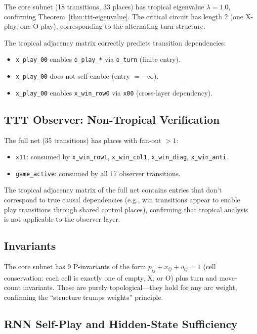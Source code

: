 \documentclass[11pt,a4paper]{article}
\begin{document}
The core subnet (18 transitions, 33 places) has tropical eigenvalue $\lambda = 1.0$, confirming Theorem~\ref{thm:ttt-eigenvalue}.
The critical circuit has length 2 (one X-play, one O-play), corresponding to the alternating turn structure.

The tropical adjacency matrix correctly predicts transition dependencies:
\begin{itemize}
  \item \texttt{x\_play\_00} enables \texttt{o\_play\_*} via \texttt{o\_turn} (finite entry).
  \item \texttt{x\_play\_00} does not self-enable (entry $= -\infty$).
  \item \texttt{x\_play\_00} enables \texttt{x\_win\_row0} via \texttt{x00} (cross-layer dependency).
\end{itemize}

\subsection{TTT Observer: Non-Tropical Verification}

The full net (35 transitions) has places with fan-out $> 1$:
\begin{itemize}
  \item \texttt{x11}: consumed by \texttt{x\_win\_row1}, \texttt{x\_win\_col1}, \texttt{x\_win\_diag}, \texttt{x\_win\_anti}.
  \item \texttt{game\_active}: consumed by all 17 observer transitions.
\end{itemize}

The tropical adjacency matrix of the full net contains entries that don't correspond to true causal dependencies (e.g., win transitions appear to enable play transitions through shared control places), confirming that tropical analysis is not applicable to the observer layer.

\subsection{Invariants}

The core subnet has 9 P-invariants of the form $p_{ij} + x_{ij} + o_{ij} = 1$ (cell conservation: each cell is exactly one of empty, X, or O) plus turn and move-count invariants.
These are purely topological---they hold for any arc weight, confirming the ``structure trumps weights'' principle.

\subsection{RNN Self-Play and Hidden-State Sufficiency}
\label{sec:rnn}
\end{document}
